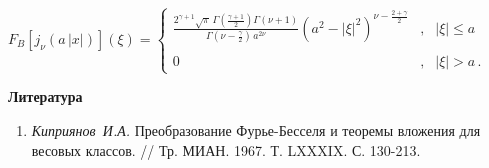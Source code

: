 $F_B[j_\nu(a\,|x|)](\xi)=\left\{\begin{array}{cll}
\frac{2^{\gamma+1}\sqrt{\pi}\,\Gamma(\frac{\gamma+1}{2})\Gamma\left(\nu+1\right)}{\Gamma\left(\nu-\frac{\gamma}{2}\right)\,a^{2\nu}}(a^2-|\xi|^2)^{{\nu-\frac{2+\gamma}{2}}} &, &  |\xi|\le a \\
{} & {} & \\									0 \, &, & |\xi|> a\,.\end{array} \right.$
%
%


%
%
%
%
\smallskip

\centerline{\bf Литература}
\vspace{-0.2cm}
\begin{enumerate}
\item {\it Киприянов~И.А.}{ Преобразование Фурье-Бесселя и теоремы вложения для весовых классов. /\!/ Тр. МИАН. 1967. Т. LXXXIX. С. 130-213.}
\end{enumerate}
